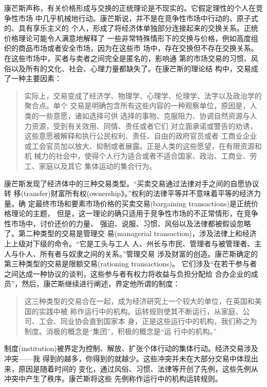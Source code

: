 康芒斯声称，有关价格形成与交换的正统理论是不现实的。它假定理性的个人在竞争性市场
中几乎机械地行动。康芒斯说，并不是在竞争性市场中行动的、原子式的、具有享乐主义的
个人，形成了将经济体单独部分连接起来的交换关系。正统价格理论可能令人满意地解释了
一些非常特殊情形下的交换与价格，例如高度组织的商品市场或者安全市场，因为在这些市
场中，存在交换但不存在交换关系。在这些市场中，买者与卖者之间完全是匿名的，影响通
第的市场交易的习惯、风俗以及所有的文化、社会、心理力量都缺失了。在康芒斯的理论结
构中，交易成了一种主要因素：

\begin{quotation}
  实际上，交易变成了经济学、物理学、心理学、伦理学、法字以及政治学的聚合点。单个
  交易是明确包含所有这些内容的一种观察单位，原因是，人类的一些意愿，诸如选择可供
  选择的事物、克服阻力、协调自然资源与人力资源，受到有关效用、同情、责任或者它们
  对立面承诺或警告的劝诱，这些意愿被解释和执行公民权利、责任、自由的政府官员或者
  工商业企业或工会官员加以放大、抑制或者展露。正是人类的这些愿望，在有限资源和机
  械力的社会中，使得个人行为适合或者不适合国家、政治、工商业、劳工、家庭以及其它
  集体运动的集合行为。
\end{quotation}

康芒斯发现了经济体中的三种交易类型。“买卖交易通过法律对手之间的自愿协议转
移(transfer)财富所有权(ownership》。”权利的法律平等并不意味着平等的经济力量。确
定最终市场和要素市场价格的买卖交易(bargaining transactions)是正统价格理论的主题，
但是，这一理论的确只适用于竞争性市场的不正常情形，在竞争性市场中，讨价还价的力量、
强迫、说服、习惯、风俗以及法律都被假设忽略了。第二种类型的交易是管理交
易(managerial transaction)，涉及法律上和经济上上级对下级的命令。“它是工头与工人
人、州长与市民、管理者与被管理者、主人与仆人、所有者与奴隶之间的关系。”管理交易
涉及财富的创造。康芒斯确定的第三种类型的交易是限额交易(rationing transactions)。
它们涉及“在若干参与者之间达成一种协议的谈判，这些参与者有权力将收益与负担分配给
合办企业的成员”，然后，康芒斯继续进行阐述，界定他所谓的制度：

\begin{quotation}
  这三种类型的交易合在一起，成为经济研究上一个较大的单位，在英国和美国的实践中被
  称作运行中的机构。运转规则使其不断运行，从家庭、公司、工会、同业协会直到国家本
  身，正是这些运行中的机构，我们称之为制度。消极的概念是“集团”，积极的概念是“运
  行中的机构。”
\end{quotation}

制度(institution)被界定为控制、解放、扩张个体行动的集体行动。经济交易涉及冲突——我
得到的越多，你得到的就越少。这些冲突并未在大部分交易中体现出来，原因是随着时间的
变化，通过风俗、习惯、法律等开创了先例，这些先例从冲突中产生了秩序。康芒斯将这些
先例称作运行中的机构运转规则。

